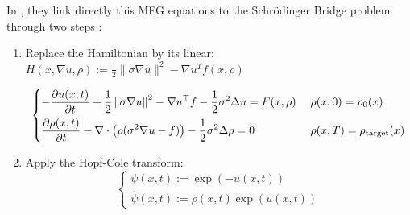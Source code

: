 \documentclass{article}
\begin{document}
In \cite{liu2022deep}, they link directly this MFG equations to the Schrödinger Bridge problem through two steps :
\begin{enumerate}
    \item Replace the Hamiltonian  by its linear: $H(x, \nabla u, \rho) := \frac{1}{2} \|\sigma \nabla u\|^2 - \nabla u^T f(x, \rho)$

    \begin{equation}
    \label{eq:mfg_pdes}
    \begin{cases}
        \displaystyle -\frac{\partial u(x,t)}{\partial t}
        + \frac{1}{2} \left\Vert \sigma \nabla u\right\Vert_{}^2
        - \nabla u^\top f
        - \frac{1}{2} \sigma^2 \Delta u
        = F(x, \rho)
        & \; \rho(x, 0) = \rho_0(x) \\[7pt]
        \displaystyle \frac{\partial \rho(x,t)}{\partial t}
        - \nabla \cdot \left(\rho (\sigma^2 \nabla u - f)\right)
        - \frac{1}{2} \sigma^2 \Delta \rho
        = 0
        & \; \rho(x, T) = \rho_{\rm target}(x)
    \end{cases}
    \end{equation}

    \item Apply the Hopf-Cole transform:
    \begin{equation}
        \begin{cases}
            \displaystyle \psi(x, t) := \exp (-u(x, t)) \\[7pt]
            \displaystyle \widehat{\psi}(x, t) := \rho(x, t) \exp (u(x, t))
        \end{cases}
    \end{equation}

\end{enumerate}
\end{document}
